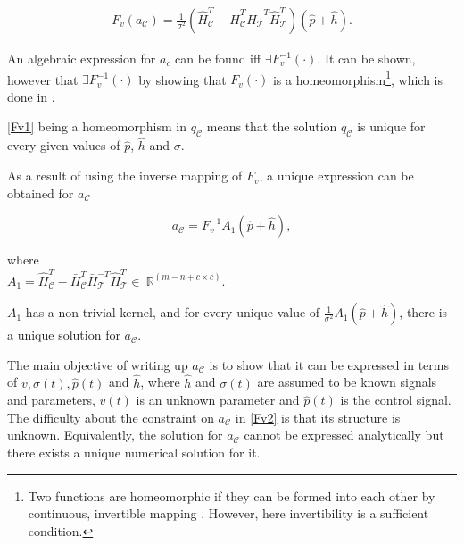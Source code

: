 \begin{equation}
\begin{split}
\label{Fv1}
F_v(a_{\mathcal{C}}) = \frac{1}{\sigma^2} (\hat{H}^T_{\mathcal{C}} -\bar{H}^T_{\mathcal{C}}\bar{H}^{-T}_{\mathcal{T}}\hat{H}^T_{\mathcal{T}})(\hat{p} + \hat{h}).
\end{split}
\end{equation}

An algebraic expression for $a_c$ can be found iff $\exists F_v^{-1}(\cdot)$. It can be shown, however that $\exists F_v^{-1}(\cdot)$ by showing that $F_v(\cdot)$ is a homeomorphism\footnote{Two functions are homeomorphic if they can be formed into each other by continuous, invertible mapping \cite{krantz2012handbook}. However, here invertibility is a sufficient condition.}, which is done in \cite{oneinput_paper}.  

\eqref{Fv1} being a homeomorphism in $q_{\mathcal{C}}$ means that the solution $q_{\mathcal{C}}$ is unique for every given values of $\hat{p}$, $\hat{h}$ and $\sigma$.

As a result of using the inverse mapping of $F_v$, a unique expression can be obtained for $a_{\mathcal{C}}$

\begin{equation}
\label{Fv2}
a_{\mathcal{C}} = F_v^{-1} A_1(\hat{p} + \hat{h}),
\end{equation}

  \begin{minipage}[t]{0.60\textwidth}
where\\
\hspace*{8mm} $A_1 = \hat{H}^T_{\mathcal{C}} -\bar{H}^T_{\mathcal{C}}\bar{H}^{-T}_{\mathcal{T}}\hat{H}^T_{\mathcal{T}}\in \: \mathbb{R}^{(m-n+c \times c)}$. 
\end{minipage}

$A_1$ has a non-trivial kernel, and for every unique value of $\frac{1}{\sigma^2} A_1 (\hat{p}+\hat{h}) $, there is a unique solution for $a_{\mathcal{C}}$.


The main objective of writing up $a_{\mathcal{C}}$ is to show that it can be expressed in terms of $v, \sigma(t), \hat{p}(t)$ and $\hat{h}$, where $\hat{h}$ and $\sigma(t)$ are assumed to be known signals and parameters, $v(t)$ is an unknown parameter and $\hat{p}(t)$ is the control signal. The difficulty about the constraint on $a_{\mathcal{C}}$ in \eqref{Fv2} is that its structure is unknown. Equivalently, the solution for $a_{\mathcal{C}}$ cannot be expressed analytically but there exists a unique numerical solution for it.  

